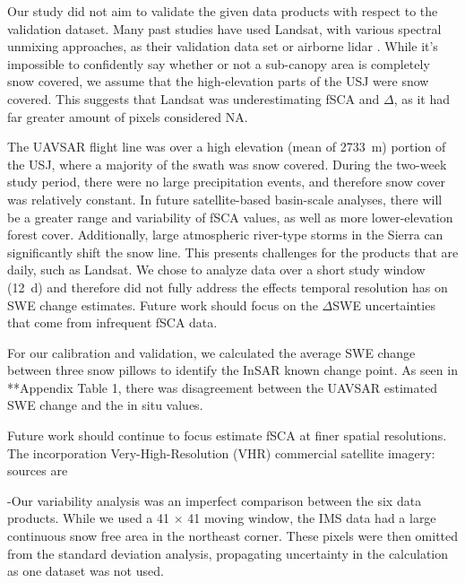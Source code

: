 Our study did not aim to validate the given data products with respect to the validation dataset. Many past studies have used Landsat, with various spectral unmixing approaches, as their validation data set \citep{painterRetrievalSubpixelSnow2009,rittgerAssessmentMethodsMapping2013 } or airborne lidar \citep{stillingerLandsatMODISVIIRS2023a}. While it's impossible to confidently say whether or not a sub-canopy area is completely snow covered, we assume that the high-elevation parts of the USJ were snow covered. This suggests that Landsat was underestimating fSCA and $\Delta$, as it had far greater amount of pixels considered NA.

The UAVSAR flight line was over a high elevation (mean of 2733~m) portion of the USJ, where a majority of the swath was snow covered. During the two-week study period, there were no large precipitation events, and therefore snow cover was relatively constant. In future satellite-based basin-scale analyses, there will be a greater range and variability of fSCA values, as well as more lower-elevation forest cover. Additionally, large atmospheric river-type storms in the Sierra can significantly shift the snow line. This presents challenges for the products that are daily, such as Landsat. We chose to analyze data over a short study window (12~d) and therefore did not fully address the effects temporal resolution has on SWE change estimates. Future work should focus on the $\Delta$SWE uncertainties that come from infrequent fSCA data.

For our calibration and validation, we calculated the average SWE change between three snow pillows to identify the InSAR known change point. As seen in **Appendix Table 1, there was disagreement between the UAVSAR estimated SWE change and the in situ values. 

Future work should continue to focus estimate fSCA at finer spatial resolutions. The incorporation Very-High-Resolution (VHR) commercial satellite imagery: sources are \citep{huImprovingMountainSnow2022, thalerEstimatingSnowCover2023,yangHighresolutionMappingSnow2023,johnHighResolutionSnowCoveredArea2022}


-Our variability analysis was an imperfect comparison between the six data products. While we used a 41 $\times$ 41 moving window, the IMS data had a large continuous snow free area in the northeast corner. These pixels were then omitted from the standard deviation analysis, propagating uncertainty in the calculation as one dataset was not used.


